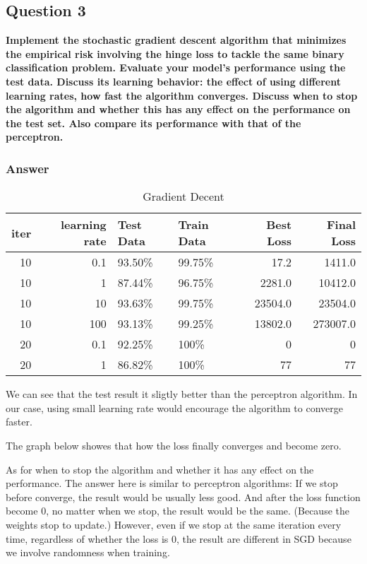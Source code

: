 \documentclass{article}
\begin{document}
\subsection{Question 3}
\label{sec-1-3}

\textbf{Implement the stochastic gradient descent algorithm that minimizes the empirical risk involving the hinge loss to tackle the same binary classification problem. Evaluate your model’s performance using the test data. Discuss its learning behavior: the effect of using different learning rates, how fast the algorithm converges. Discuss when to stop the algorithm and whether this has any effect on the performance on the test set. Also compare its performance with that of the perceptron.}

\subsubsection{Answer}
\label{sec-1-3-1}

\begin{table}[htb]
\caption{\label{tab:gradient-decent-data}Gradient Decent}
\centering
\begin{tabular}{rr|ll|rr}
\hline
iter & learning rate & Test Data & Train Data & Best Loss & Final Loss\\
\hline
10 & 0.1 & 93.50\% & 99.75\% & 17.2 & 1411.0\\
10 & 1 & 87.44\% & 96.75\% & 2281.0 & 10412.0\\
10 & 10 & 93.63\% & 99.75\% & 23504.0 & 23504.0\\
10 & 100 & 93.13\% & 99.25\% & 13802.0 & 273007.0\\
20 & 0.1 & 92.25\% & 100\% & 0 & 0\\
20 & 1 & 86.82\% & 100\% & 77 & 77\\
\hline
\end{tabular}
\end{table}

We can see that the test result it sligtly better than the perceptron algorithm. In
our case, using small learning rate would encourage the algorithm to converge
faster.

The graph below showes that how the loss finally converges and become zero.



As for when to stop the algorithm and whether it has any effect on the performance. The answer here is similar to perceptron algorithms: If we stop before converge, the result would be usually less good. And after the loss function become 0, no matter when we stop, the result would be the same. (Because the weights stop to update.) However, even if we stop at the same iteration every time, regardless of whether the loss is 0, the result are different in SGD because we involve randomness when training.
\end{document}
